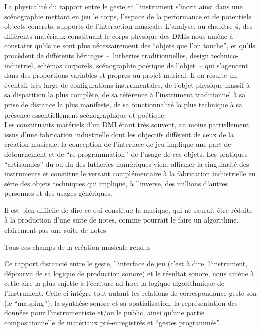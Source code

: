 La physicalité du rapport entre le geste et l'instrument s'incrit ainsi dans une scénographie mettant en jeu le corps, l'espace de la performance et de potentiels objects concrets, supports de l'interaction musicale. L'analyse, au chapitre 4, des différents matériaux constituant le corps physique des \glspl{DMI} nous amène à constater qu'ils ne sont plus nécessairement des ``objets que l'on touche'', et qu'ils procèdent de différents héritages --~lutheries traditionnelles, design technico-industriel, schémas corporels, scénographie poétique de l'objet~-- qui s'agencent dans des proportions variables et propres au projet musical. Il en résulte un éventail très large de configurations instrumentales, de l'objet physique massif à sa disparition la plus complète, de sa référence à l'instrument traditionnel à sa prise de distance la plus manifeste, de sa fonctionnalité la plus technique à sa présence essentiellement scénographique et poétique.\\
\indent Les constituants matériels d'un \gls{DMI} étant très souvent, au moins partiellement, issus d'une fabrication industrielle dont les objectifs diffèrent de ceux de la création musicale, la conception de l'interface de jeu implique une part de détournement et de ``re-programmation'' de l'usage de ces objets.
Les pratiques ``artisanales'' du  ou du  des lutheries numériques vient affirmer la singularité des instruments et constitue le versant complémentaire à la fabrication industrielle en série des objets techniques qui implique, à l'inverse, des millions d'autres personnes et des usages génériques.

Il est bien difficile de dire ce qui constitue la musique, qui ne saurait être réduite à la production d'une suite de notes, comme pourrait le faire un algorithme. clairement pas une suite de notes

Tous ces champs de la création musicale rendus 


Ce rapport distancié entre le geste, l'interface de jeu (c'est à dire, l'instrument, dépourvu de sa logique de production sonore) et le résultat sonore, nous amène à cette aire la plus sujette à l'écriture ad-hoc: la logique algorithmique de l'instrument. Celle-ci intègre tout autant les relations de correspondance geste-son (le ``mapping''),  la synthèse sonore et sa spatialisation, la représentation des données pour l'instrumentiste et/ou le public, ainsi qu'une partie compositionnelle de matériaux pré-enregistrés et ``gestes programmés''. 

